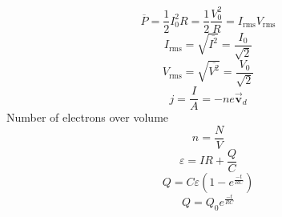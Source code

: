 \documentclass[12pt,landscape]{article}
\begin{document}
\begin{multicols}{4}
    \begin{equation*}
        \overbar{P} = \frac{1}{2} I_0^2 R = \frac{1}{2} \frac{V_0^2}{R}= I_{\text{rms}} V_{\text{rms}}
    \end{equation*}
    \begin{equation*}
        I_{\text{rms}} = \sqrt{\overbar{I^2}} = \frac{I_0}{\sqrt{2}}
    \end{equation*}
    \begin{equation*}
        V_{\text{rms}} = \sqrt{\overbar{V^2}} = \frac{V_0}{\sqrt{2}}
    \end{equation*}
    \begin{equation*}
        j = \frac{I}{A} = -n e \vec{\mathbf{v}}_d
    \end{equation*}
    Number of electrons over volume
    \begin{equation*}
        n = \frac{N}{V}
    \end{equation*}
    \begin{equation*}
        \varepsilon = IR + \frac{Q}{C}
    \end{equation*}
    \begin{equation*}
        Q = C\varepsilon \left(1 - e^{\frac{-t}{RC}} \right)
    \end{equation*}
    \begin{equation*}
        Q = Q_0 e^{\frac{-t}{RC}}
    \end{equation*}


\end{multicols}
\end{document}
